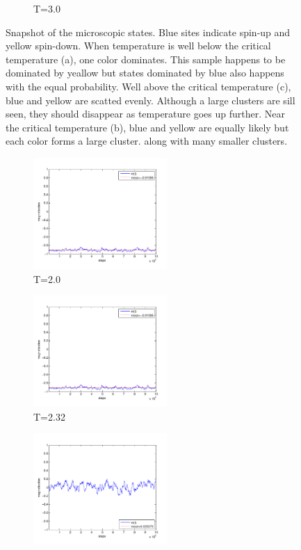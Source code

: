 \begin{figure}
\begin{subfigure}{0.32\textwidth}
		\caption{T=3.0}
	\end{subfigure}
	\caption{Snapshot of the microscopic states.  Blue sites indicate spin-up and yellow spin-down.  When temperature is well below the critical temperature (a), one color dominates. This sample happens to be dominated by yeallow but states dominated by blue also happens with the equal probability.  Well above the critical temperature (c), blue and yellow are scatted evenly.  Although a large clusters are sill seen, they should disappear as temperature goes up further.  Near the critical temperature (b),  blue and yellow are equally likely but each color forms a large cluster. along with many smaller clusters. }\label{fig:ising_S_sample}
\end{figure}

\begin{figure}
	\centering
	\begin{subfigure}{0.32\textwidth}
		\centering
		\includegraphics[width=2in]{17.Metropolis/ising_M_T=200.pdf}
		\caption{T=2.0}
	\end{subfigure}
	\begin{subfigure}{0.32\textwidth}
		\centering
		\includegraphics[width=2in]{17.Metropolis/ising_M_T=200.pdf}
		\caption{T=2.32}
	\end{subfigure}
	\begin{subfigure}{0.32\textwidth}
		\centering
		\includegraphics[width=2in]{17.Metropolis/ising_M_T=300.pdf}

\end{subfigure}
\end{figure}
